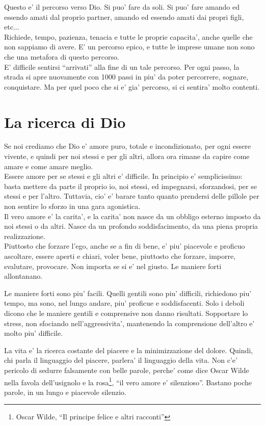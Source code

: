 Questo e' il percorso verso Dio. Si puo' fare da soli. Si puo' fare amando ed essendo amati dal proprio partner, amando ed essendo amati dai propri figli, etc...\\
Richiede, tempo, pazienza, tenacia e tutte le proprie capacita', anche quelle che non sappiamo di avere. E' un percorso epico, e tutte le imprese umane non sono che una metafora di questo percorso. \\

E' difficile sentirsi ``arrivati'' alla fine di un tale percorso. Per ogni passo, la strada si apre nuovamente con 1000 passi in piu' da poter percorrere, sognare, conquistare. Ma per quel poco che si e' gia' percorso, si ci sentira' molto contenti.




\section{La ricerca di Dio}
\label{laricerca}

Se noi crediamo che Dio e' amore puro, totale e incondizionato, per ogni essere vivente, e quindi per noi stessi e per gli altri, allora ora rimane da capire come amare e come amare meglio.\\

Essere amore per se stessi e gli altri e' difficile. In principio e' semplicissimo: basta mettere da parte il proprio io, noi stessi, ed impegnarsi, sforzandosi, per se stessi e per l'altro. Tuttavia, cio' e' barare tanto quanto prendersi delle pillole per non sentire lo sforzo in una gara agonistica.\\
Il vero amore e' la carita', e la carita' non nasce da un obbligo esterno imposto da noi stessi o da altri. Nasce da un profondo soddisfacimento, da una piena propria realizzazione.\\
Piuttosto che forzare l'ego, anche se a fin di bene, e' piu' piacevole e proficuo ascoltare, essere aperti e chiari, voler bene, piuttosto che forzare, imporre, svalutare, provocare. Non importa se si e' nel giusto. Le maniere forti allontanano.

Le maniere forti sono piu' facili. Quelli gentili sono piu' difficili, richiedono piu' tempo, ma sono, nel lungo andare, piu' proficue e soddisfacenti. Solo i deboli dicono che le maniere gentili e comprensive non danno risultati. Sopportare lo stress, non sfociando nell'aggressivita', mantenendo la comprensione dell'altro e' molto piu' difficile. 

La vita e' la ricerca costante del piacere e la minimizzazione del dolore. Quindi, chi parla il linguaggio del piacere, parlera' il linguaggio della vita. Non c'e' pericolo di sedurre falsamente con belle parole, perche' come dice Oscar Wilde nella favola dell'usignolo e la rosa\footnote{Oscar Wilde, ``Il principe felice e altri racconti''}, ``il vero amore e' silenzioso''. Bastano poche parole, in un lungo e piacevole silenzio.


